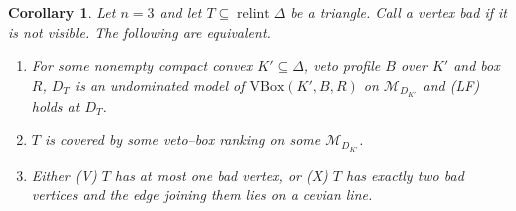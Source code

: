 \documentclass[11pt]{article}
\newcommand{\M}{\mathcal{M}}
\DeclareMathOperator{\relint}{relint}
\theoremstyle{plain}
\newtheorem{corollary}[theorem]{Corollary}
\theoremstyle{definition}
\theoremstyle{remark}
\begin{document}
\begin{corollary}\label{cor:BX3}
Let $n=3$ and let $T\subseteq\relint\Delta$ be a triangle. Call a vertex \emph{bad} if it
is not visible. The following are equivalent.
\begin{enumerate}[label=(\roman*)]
  \item For some nonempty compact convex $K'\subseteq\Delta$, veto profile $B$ over $K'$
  and box $R$, $D_T$ is an undominated model of $\mathrm{VBox}(K',B,R)$ on
  $\M_{D_{K'}}$ and (LF) holds at $D_T$.
  \item $T$ is covered by some veto--box ranking on some $\M_{D_{K'}}$.
  \item Either (V) $T$ has at most one bad vertex, or (X) $T$ has exactly two bad vertices
  and the edge joining them lies on a cevian line.
\end{enumerate}
\end{corollary}
\end{document}
